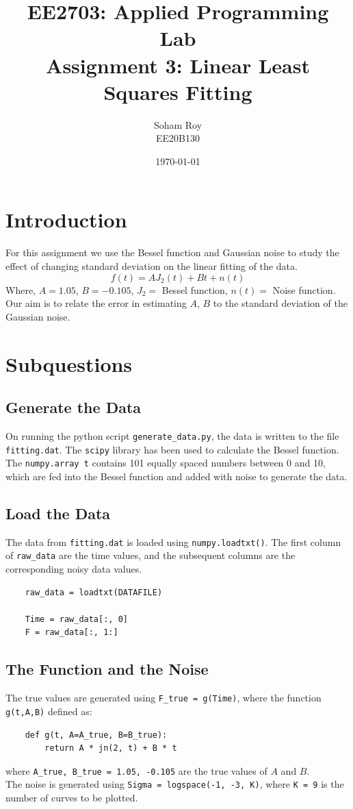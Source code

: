 \documentclass[12pt, a4paper]{article}
\title{
    EE2703: Applied Programming Lab \\
    \Large Assignment 3: Linear Least Squares Fitting
}
\author{Soham Roy \\ \normalsize EE20B130}
\date{\today}
\begin{document}
\maketitle %


\section{Introduction}
For this assignment we use the Bessel function and Gaussian noise to study
the effect of changing standard deviation on the linear fitting of the data.
\begin{equation*}
    f(t) = AJ_2(t) + Bt + n(t)
\end{equation*}
Where, $A = 1.05$, $B = -0.105$, $J_2 =$ Bessel function, $n(t) =$ Noise function.
Our aim is to relate the error in estimating $A$, $B$ to the
standard deviation of the Gaussian noise.


\section{Subquestions}
\subsection{Generate the Data}
On running the python script \texttt{generate\_data.py}, the data is written to
the file \texttt{fitting.dat}. The \texttt{scipy} library has been used to calculate
the Bessel function. The \texttt{numpy.array t} contains 101 equally spaced numbers
between 0 and 10, which are fed into the Bessel function and added with noise to
generate the data.


\subsection{Load the Data}
The data from \texttt{fitting.dat} is loaded using \texttt{numpy.loadtxt()}.
The first column of \texttt{raw\_data} are the time values, and the subsequent
columns are the corresponding noisy data values.
\begin{verbatim}
    raw_data = loadtxt(DATAFILE)

    Time = raw_data[:, 0]
    F = raw_data[:, 1:]
\end{verbatim}


\subsection{The Function and the Noise}
The true values are generated using \texttt{F\_true = g(Time)},
where the function \texttt{g(t,A,B)} defined as:
\begin{verbatim}
    def g(t, A=A_true, B=B_true):
        return A * jn(2, t) + B * t
\end{verbatim}
where \texttt{A\_true, B\_true = 1.05, -0.105} are the true values of $A$ and $B$. \\
The noise is generated using \texttt{Sigma = logspace(-1, -3, K)}, where
\texttt{K = 9} is the number of curves to be plotted.
\end{document}
